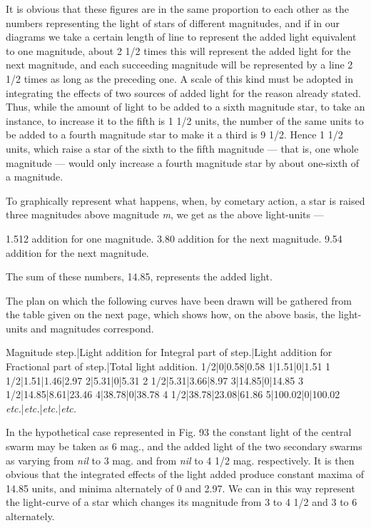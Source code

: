 \documentclass[a4paper, 12pt, oneside, polutonikogreek, english]{article}
\begin{document}
It is obvious that these figures are in the same proportion to each other as the numbers representing the light of stars of different magnitudes, and if in our diagrams we take a certain length of line to represent the added light equivalent to one magnitude, about 2 1/2 times this will represent the added light for the next magnitude, and each succeeding magnitude will be represented by a line 2 1/2 times as long as the preceding one. A scale of this kind must be adopted in integrating the effects of two sources of added light for the reason already stated. Thus, while the amount of light to be added to a sixth magnitude star, to take an instance, to increase it to the fifth is 1 1/2 units, the number of the same units to be added to a fourth magnitude star to make it a third is 9 1/2. Hence 1 1/2 units, which raise a star of the sixth to the fifth magnitude --- that is, one whole magnitude --- would only increase a fourth magnitude star by about one-sixth of a magnitude.

To graphically represent what happens, when, by cometary action, a star is raised three magnitudes above magnitude \emph{m}, we get as the above light-units ---

1.512 addition for one magnitude. 3.80 addition for the next magnitude. 9.54 addition for the next magnitude.

The sum of these numbers, 14.85, represents the added light.

The plan on which the following curves have been drawn will be gathered from the table given on the next page, which shows how, on the above basis, the light-units and magnitudes correspond.

Magnitude step.|Light addition for Integral part of step.|Light addition for Fractional part of step.|Total light addition. 
1/2|0|0.58|0.58 
1|1.51|0|1.51 
1 1/2|1.51|1.46|2.97 
2|5.31|0|5.31 
2 1/2|5.31|3.66|8.97 
3|14.85|0|14.85 
3 1/2|14.85|8.61|23.46 
4|38.78|0|38.78 
4 1/2|38.78|23.08|61.86 
5|100.02|0|100.02 
\emph{etc.}|\emph{etc.}|\emph{etc.}|\emph{etc.} 

In the hypothetical case represented in Fig. 93 the constant light of the central swarm may be taken as 6 mag., and the added light of the two secondary swarms as varying from \emph{nil} to 3 mag. and from \emph{nil} to 4 1/2 mag. respectively. It is then obvious that the integrated effects of the light added produce constant maxima of 14.85 units, and minima alternately of 0 and 2.97. We can in this way represent the light-curve of a star which changes its magnitude from 3 to 4 1/2 and 3 to 6 alternately.
\end{document}
